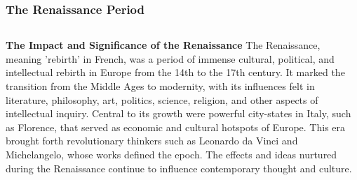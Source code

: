 \documentclass[5pt]{beamer}
\begin{document}
\begin{frame}
\frametitle{The Renaissance Period}
\begin{columns}
\begin{column}{0.7\textwidth}
\begin{block}{\textbf{The Impact and Significance of the Renaissance}}
The Renaissance, meaning 'rebirth' in French, was a period of immense cultural, political, and intellectual rebirth in Europe from the 14th to the 17th century. It marked the transition from the Middle Ages to modernity, with its influences felt in literature, philosophy, art, politics, science, religion, and other aspects of intellectual inquiry. Central to its growth were powerful city-states in Italy, such as Florence, that served as economic and cultural hotspots of Europe. This era brought forth revolutionary thinkers such as Leonardo da Vinci and Michelangelo, whose works defined the epoch. The effects and ideas nurtured during the Renaissance continue to influence contemporary thought and culture.
\end{block}
\end{column}
\end{columns}
\end{frame}
\end{document}
